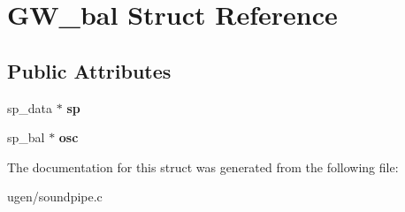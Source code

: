 \hypertarget{structGW__bal}{}\section{G\+W\+\_\+bal Struct Reference}
\label{structGW__bal}
\subsection*{Public Attributes}
\begin{DoxyCompactItemize}
\item 
\hypertarget{structGW__bal_a1a02b7ce115dd3b79be2947c4385d171}{}\label{structGW__bal_a1a02b7ce115dd3b79be2947c4385d171} 
sp\+\_\+data $\ast$ {\bfseries sp}
\item 
\hypertarget{structGW__bal_ae774da9e1cd62d7a8c4864a9970fdd6a}{}\label{structGW__bal_ae774da9e1cd62d7a8c4864a9970fdd6a} 
sp\+\_\+bal $\ast$ {\bfseries osc}
\end{DoxyCompactItemize}


The documentation for this struct was generated from the following file\+:\begin{DoxyCompactItemize}
\item 
ugen/soundpipe.\+c\end{DoxyCompactItemize}
